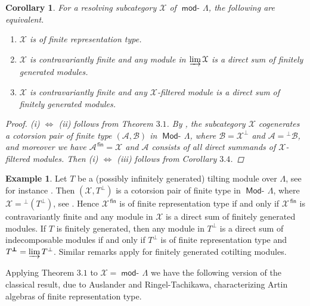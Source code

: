 \documentclass[oneside, a4paper,reqno]{amsart}
\numberwithin{equation}{section}
\newtheorem{cor}[thm]{Corollary}
\theoremstyle{definition}
\newtheorem{exam}[thm]{Example}
\begin{document}
\begin{cor} For a resolving subcategory  ${\mathcal X}$ of $\operatorname*{\mathsf{mod}-\!}\Lambda$, the
following are equivalent.
\begin{enumerate}
\item ${\mathcal X}$ is of finite representation type.
\item ${\mathcal X}$ is contravariantly finite and any module in $\operatorname*{\varinjlim}{\mathcal X}$ is
a  direct sum of finitely generated modules.
\item ${\mathcal X}$ is contravariantly finite and any ${\mathcal X}$-filtered module is
a  direct sum of finitely generated modules.
\end{enumerate}
\begin{proof} (i) $\Leftrightarrow$ (ii) follows from Theorem $3.1$.
By \cite{AT}, the subcategory ${\mathcal X}$ cogenerates a cotorsion pair of
finite type $({\mathscr A},{\mathscr B})$  in $\operatorname*{\mathsf{Mod}-\!}\Lambda$, where ${\mathscr B} =
{\mathcal X}^{\pmb{\bot}}$ and ${\mathscr A} = {^{\bot}}{\mathscr B}$, and moreover we have
${\mathscr A}^\operatorname*{\,\mathsf{fin}} = {\mathcal X}$ and ${\mathscr A}$ consists of all direct summands of
${\mathcal X}$-filtered modules. Then (i) $\Leftrightarrow$ (iii) follows from
Corollary $3.4$.
\end{proof}
\end{cor}

\begin{exam} Let $T$ be a (possibly infinitely generated) tilting module over
 $\Lambda$, see for instance \cite{AST}.  Then
$({\mathcal X},T^{\bot})$ is a cotorsion pair of finite type in $\operatorname*{\mathsf{Mod}-\!}\Lambda$,
where ${\mathcal X} = {^{\bot}}(T^{\bot})$, see \cite{BS}. Hence ${\mathcal X}^\operatorname*{\,\mathsf{fin}}$
is of finite representation type if and only if ${\mathcal X}^\operatorname*{\,\mathsf{fin}}$ is
contravariantly finite and any module in ${\mathcal X}$ is a direct sum of
finitely generated modules. If $T$ is finitely generated, then any
module in $T^{\pmb \bot}$ is a direct sum of indecomposable modules
if and only if $T^{\bot}$ is of finite representation type and
$T^{\pmb \bot} = \operatorname*{\varinjlim} T^{\bot}$. Similar remarks apply for
finitely generated cotilting modules.
\end{exam}

Applying Theorem $3.1$ to ${\mathcal X} = \operatorname*{\mathsf{mod}-\!}\Lambda$ we have the following
version of the classical result, due to Auslander and
Ringel-Tachikawa, characterizing Artin algebras of finite
representation type.
\end{document}
